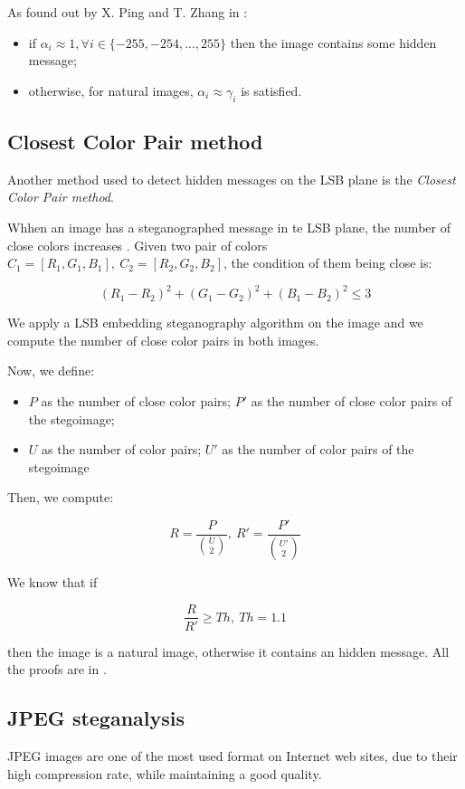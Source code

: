 \documentclass[../../main.tex]{subfiles}
\begin{document}
As found out by X. Ping and T. Zhang in
\cite{new-detection-lsb-steganography}:

\begin{itemize}[noitemsep]
    \item if $\alpha_i \approx 1, \forall i \in \{-255, -254, ..., 255\}$
          then the image contains some hidden message;
    \item otherwise, for natural images, $\alpha_i \approx \gamma_i$ is
          satisfied.
\end{itemize}

\subsection{Closest Color Pair method}
Another method used to detect hidden messages on the LSB plane is the
\emph{Closest Color Pair method}.

Whhen an image has a steganographed message in te LSB plane, the number of
close colors increases \cite{detecting-lsb-steganography}. Given two pair of
colors $C_1=[R_1,G_1,B_1],\ C_2=[R_2,G_2,B_2]$, the condition of them being
close is:

\[ (R_1-R_2)^2+(G_1-G_2)^2+(B_1-B_2)^2 \leq 3 \]

We apply a LSB embedding steganography algorithm on the image and we compute
the number of close color pairs in both images.

Now, we define:

\begin{itemize}[noitemsep]
    \item $P$ as the number of close color pairs; $P'$ as the number of
          close color pairs of the stegoimage;
    \item $U$ as the number of color pairs; $U'$ as the number of color
          pairs of the stegoimage
\end{itemize}

Then, we compute:

\[ R = \frac{P}{\binom{U}{2}},\ R' = \frac{P'}{\binom{U'}{2}} \]

We know that if

\[ \frac{R}{R'} \geq Th,\ Th = 1.1 \]

\noindent then the image is a natural image, otherwise it contains an hidden
message. All the proofs are in \cite{detecting-lsb-steganography}.

\subsection{JPEG steganalysis}
JPEG images are one of the most used format on Internet web sites, due to
their high compression rate, while maintaining a good quality.
\end{document}
